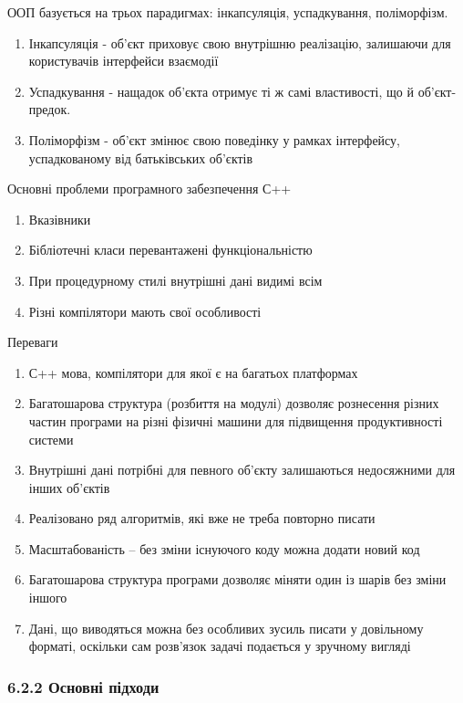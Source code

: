 ООП базується на трьох парадигмах: інкапсуляція, успадкування,
поліморфізм.

\begin{enumerate}
\def\labelenumi{\arabic{enumi}.}
\item
  Інкапсуляція - об'єкт приховує свою внутрішню реалізацію, залишаючи
  для користувачів інтерфейси взаємодії
\item
  Успадкування - нащадок об'єкта отримує ті ж самі властивості, що й
  об'єкт-предок.
\item
  Поліморфізм - об'єкт змінює свою поведінку у рамках інтерфейсу,
  успадкованому від батьківських об'єктів
\end{enumerate}

Основні проблеми програмного забезпечення С++

\begin{enumerate}
\def\labelenumi{\arabic{enumi}.}
\item
  Вказівники
\item
  Бібліотечні класи перевантажені функціональністю
\item
  При процедурному стилі внутрішні дані видимі всім
\item
  Різні компілятори мають свої особливості
\end{enumerate}

Переваги

\begin{enumerate}
\def\labelenumi{\arabic{enumi}.}
\item
  С++ мова, компілятори для якої є на багатьох платформах
\item
  Багатошарова структура (розбиття на модулі) дозволяє рознесення різних
  частин програми на різні фізичні машини для підвищення продуктивності
  системи
\item
  Внутрішні дані потрібні для певного об'єкту залишаються недосяжними
  для інших об'єктів
\item
  Реалізовано ряд алгоритмів, які вже не треба повторно писати
\item
  Масштабованість -- без зміни існуючого коду можна додати новий код
\item
  Багатошарова структура програми дозволяє міняти один із шарів без
  зміни іншого
\item
  Дані, що виводяться можна без особливих зусиль писати у довільному
  форматі, оскільки сам розв'язок задачі подається у зручному вигляді
\end{enumerate}

\hypertarget{ux43eux441ux43dux43eux432ux43dux456-ux43fux456ux434ux445ux43eux434ux438}{%
\subsubsection{6.2.2 Основні
підходи}\label{ux43eux441ux43dux43eux432ux43dux456-ux43fux456ux434ux445ux43eux434ux438}}

